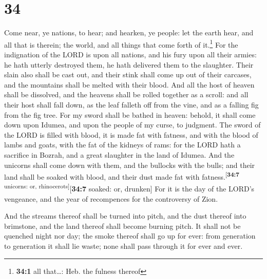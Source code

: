 \hypertarget{section-33}{%
\section{34}\label{section-33}}

 Come near, ye nations, to hear; and hearken, ye people:
let the earth hear, and all that is therein; the world, and all things
that come forth of it.\footnote{\textbf{34:1} all that\ldots: Heb. the
  fulness thereof}  For the indignation of the LORD is
upon all nations, and his fury upon all their armies: he hath utterly
destroyed them, he hath delivered them to the slaughter. 
Their slain also shall be cast out, and their stink shall come up out of
their carcases, and the mountains shall be melted with their blood.
 And all the host of heaven shall be dissolved, and the
heavens shall be rolled together as a scroll: and all their host shall
fall down, as the leaf falleth off from the vine, and as a falling fig
from the fig tree.  For my sword shall be bathed in
heaven: behold, it shall come down upon Idumea, and upon the people of
my curse, to judgment.  The sword of the LORD is filled
with blood, it is made fat with fatness, and with the blood of lambs and
goats, with the fat of the kidneys of rams: for the LORD hath a
sacrifice in Bozrah, and a great slaughter in the land of Idumea.
 And the unicorns shall come down with them, and the
bullocks with the bulls; and their land shall be soaked with blood, and
their dust made fat with fatness.\textsuperscript{{[}\textbf{34:7}
unicorns: or, rhinocerots{]}}{[}\textbf{34:7} soaked: or, drunken{]}
 For it is the day of the LORD's vengeance, and the year
of recompences for the controversy of Zion.

 And the streams thereof shall be turned into pitch, and
the dust thereof into brimstone, and the land thereof shall become
burning pitch.  It shall not be quenched night nor day;
the smoke thereof shall go up for ever: from generation to generation it
shall lie waste; none shall pass through it for ever and ever.

